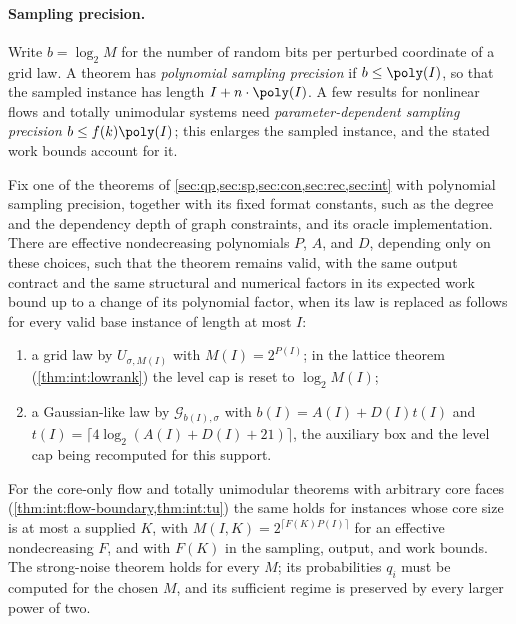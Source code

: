 \paragraph{Sampling precision.}
Write $b=\log_2M$ for the number of random bits per perturbed coordinate of a
grid law. A theorem has \emph{polynomial sampling precision} if
$b\le\poly(I)$, so that the sampled instance has length
$I+n\cdot\poly(I)$. A few results for nonlinear flows and totally
unimodular systems need \emph{parameter-dependent sampling precision}
$b\le f(k)\poly(I)$; this enlarges the sampled instance, and the stated work
bounds account for it.

\begin{proposition}\label{prop:model:uniform}
Fix one of the theorems of \cref{sec:qp,sec:sp,sec:con,sec:rec,sec:int}
with polynomial sampling precision, together with its fixed format
constants, such as the degree and the dependency depth of graph constraints,
and its oracle implementation. There are effective nondecreasing
polynomials $P$, $A$, and $D$, depending only on these choices, such that the
theorem remains valid, with the same output contract and the same
structural and numerical factors in its expected work bound up to a change
of its polynomial factor, when its law is replaced as follows for every
valid base instance of length at most $I$:
\begin{enumerate}[label=(\alph*)]
\item a grid law by $U_{\sigma,M(I)}$ with $M(I)=2^{P(I)}$; in the lattice
theorem (\cref{thm:int:lowrank}) the level cap is reset to $\log_2M(I)$;
\item a Gaussian-like law by $\mathcal G_{b(I),\sigma}$ with
$b(I)=A(I)+D(I)t(I)$ and $t(I)=\lceil4\log_2(A(I)+D(I)+21)\rceil$, the
auxiliary box and the level cap being recomputed for this support.
\end{enumerate}
For the core-only flow and totally unimodular theorems with arbitrary core
faces (\cref{thm:int:flow-boundary,thm:int:tu}) the same holds for instances
whose core size is at most a supplied $K$, with $M(I,K)=2^{\lceil
F(K)P(I)\rceil}$ for an effective nondecreasing $F$, and with $F(K)$ in the
sampling, output, and work bounds. The strong-noise theorem holds for every
$M$; its probabilities $q_i$ must be computed for the chosen $M$, and its
sufficient regime is preserved by every larger power of two.
\end{proposition}

